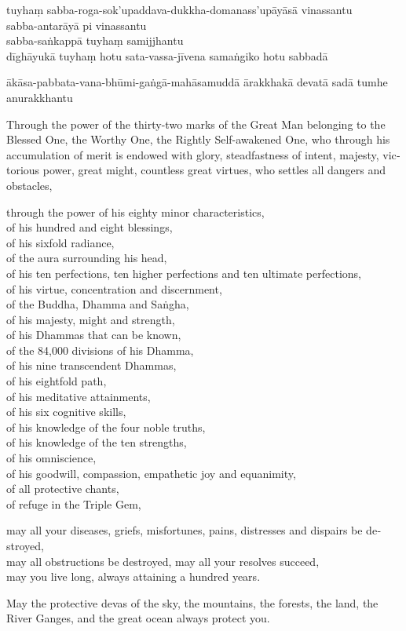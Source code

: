 tuyhaṃ sabba-roga-sok'upaddava-dukkha-domanass'upāyāsā vinassantu\\
sabba-antarāyā pi vinassantu\\
sabba-saṅkappā tuyhaṃ samijjhantu\\
dīghāyukā tuyhaṃ hotu sata-vassa-jīvena samaṅgiko hotu sabbadā

ākāsa-pabbata-vana-bhūmi-gaṅgā-mahāsamuddā ārakkhakā
devatā sadā tumhe anurakkhantu


\begin{english}
  Through the power of the thirty-two marks of the Great Man belonging to the
  Blessed One, the Worthy One, the Rightly Self-awakened One, who through his
  accumulation of merit is endowed with glory, steadfastness of intent, majesty,
  victorious power, great might, countless great virtues, who settles all
  dangers and obstacles,

  through the power of his eighty minor characteristics,\\
  of his hundred and eight blessings,\\
  of his sixfold radiance,\\
  of the aura surrounding his head,\\
  of his ten perfections, ten higher perfections and ten ultimate perfections,\\
  of his virtue, concentration and discernment,\\
  of the Buddha, Dhamma and Saṅgha,\\
  of his majesty, might and strength,\\
  of his Dhammas that can be known,\\
  of the 84,000 divisions of his Dhamma,\\
  of his nine transcendent Dhammas,\\
  of his eightfold path,\\
  of his meditative attainments,\\
  of his six cognitive skills,\\
  of his knowledge of the four noble truths,\\
  of his knowledge of the ten strengths,\\
  of his omniscience,\\
  of his goodwill, compassion, empathetic joy and equanimity,\\
  of all protective chants,\\
  of refuge in the Triple Gem,

  may all your diseases, griefs, misfortunes, pains, distresses and dispairs be destroyed,\\
  may all obstructions be destroyed, may all your resolves succeed,\\
  may you live long, always attaining a hundred years.

  May the protective devas of the sky, the mountains, the forests, the land, the
  River Ganges, and the great ocean always protect you.
\end{english}

